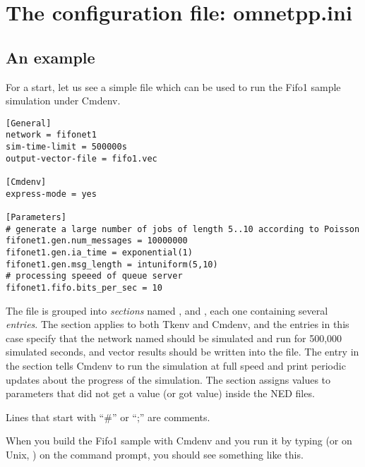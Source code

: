 \section{The configuration file: omnetpp.ini}

\subsection{An example}

For a start, let us see a simple  file which
can be used to run the Fifo1 sample simulation under Cmdenv.

\begin{verbatim}
[General]
network = fifonet1
sim-time-limit = 500000s
output-vector-file = fifo1.vec

[Cmdenv]
express-mode = yes

[Parameters]
# generate a large number of jobs of length 5..10 according to Poisson
fifonet1.gen.num_messages = 10000000
fifonet1.gen.ia_time = exponential(1)
fifonet1.gen.msg_length = intuniform(5,10)
# processing speeed of queue server
fifonet1.fifo.bits_per_sec = 10
\end{verbatim}

The file is grouped into \textit{sections} named \ttt{[General]}, \ttt{[Cmdenv]}
and \ttt{[Parameters]}, each one containing several \textit{entries}.
The \ttt{[General]} section applies to both Tkenv and Cmdenv, and the entries
in this case specify that the network named  should be simulated and run
for 500,000 simulated seconds, and vector results should be written into the
 file. The entry in the \ttt{[Cmdenv]} section tells
Cmdenv to run the simulation at full speed and print periodic updates
about the progress of the simulation. The \ttt{[Parameters]} section assigns
values to parameters that did not get a value (or got  value)
inside the NED files.

Lines that start with ``\#'' or ``;'' are comments.

When you build the Fifo1 sample with Cmdenv and you run it by typing 
(or on Unix, ) on the command prompt, you should see
something like this.

